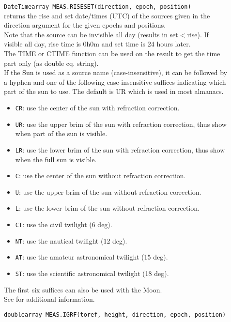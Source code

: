 \begin{description}
  \item[] \texttt{DateTimearray MEAS.RISESET(direction, epoch, position)}\\
    returns the rise and set date/times (UTC) of the sources given in the
    direction argument for the given epochs and positions.\\
    Note that the source can be invisible all day (results in
    set$<$rise). If visible all day, rise time is 0h0m and set time is
    24 hours later.
    \\The TIME or CTIME function can be used on the result to get the
    time part only (as double cq. string). 
    \\If the Sun is used as a source name (case-insensitive), it can
    be followed by a hyphen 
    and one of the following case-insensitive suffices indicating
    which part of the sun
    to use. The default is UR which is used in most almanacs.
    \begin{itemize}
      \item \texttt{CR}: use the center of the sun with refraction correction.
      \item \texttt{UR}: use the upper brim of the sun with refraction
        correction, thus show when part of the sun is visible. 
      \item \texttt{LR}: use the lower brim of the sun with refraction 
        correction, thus show when the full sun is visible.
      \item \texttt{C}: use the center of the sun without refraction correction.
      \item \texttt{U}: use the upper brim of the sun without refraction correction.
      \item \texttt{L}: use the lower brim of the sun without refraction correction.
      \item \texttt{CT}: use the civil twilight (6 deg).
      \item \texttt{NT}: use the nautical twilight (12 deg).
      \item \texttt{AT}: use the amateur astronomical twilight (15 deg).
      \item \texttt{ST}: use the scientific astronomical twilight (18 deg).
    \end{itemize}
    The first six suffices can also be used with the Moon. 
    \\See
    for additional information.
  \item[] \texttt{doublearray MEAS.IGRF(toref, height, direction, epoch, position)}\\

\end{description}
